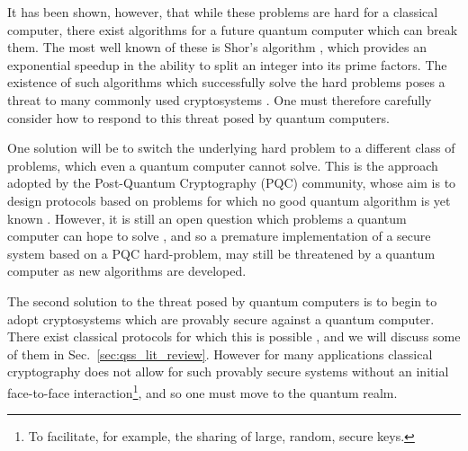 It has been shown, however, that while these problems are hard for a classical computer, there exist algorithms for a future quantum computer which can break them. The most well known of these is Shor's algorithm \cite{Shor1997},  which provides an exponential speedup in the ability to split an integer into its prime factors. %
The existence of such algorithms which successfully solve the hard problems poses a threat to many commonly used cryptosystems %
\cite{Rivest1978, Schneier1996, Amiri2015, Nielsen2010, Shor1997}. One must therefore carefully consider how to respond to this threat posed by quantum computers. 

One solution will be to switch the underlying hard problem to a different class of problems, which even a quantum computer cannot solve. This is the approach adopted by the Post-Quantum Cryptography (PQC) community, whose aim is to design protocols based on problems for which no good quantum algorithm is yet known \cite{Bernstein2017, Chen2016, Gagliardoni2017a, Bernstein2009, Alagic2019, Chrome2016}. However, it is still an open question which problems a quantum computer can hope to solve%
, and so a premature implementation of a secure system based on a PQC hard-problem, may still be threatened by a quantum computer as new algorithms are developed. 


The second solution to the threat posed by quantum computers is to begin to adopt cryptosystems which are provably secure against a quantum computer. There exist classical protocols for which this is possible \cite{Shamir1979, Blakley1979}, and we will discuss some of them in Sec.~\ref{sec:qss_lit_review}. However for many applications classical cryptography does not allow for such provably secure systems without an initial face-to-face interaction\footnote{To facilitate, for example, the sharing of large, random, secure keys.}, and so one must move to the quantum realm.

